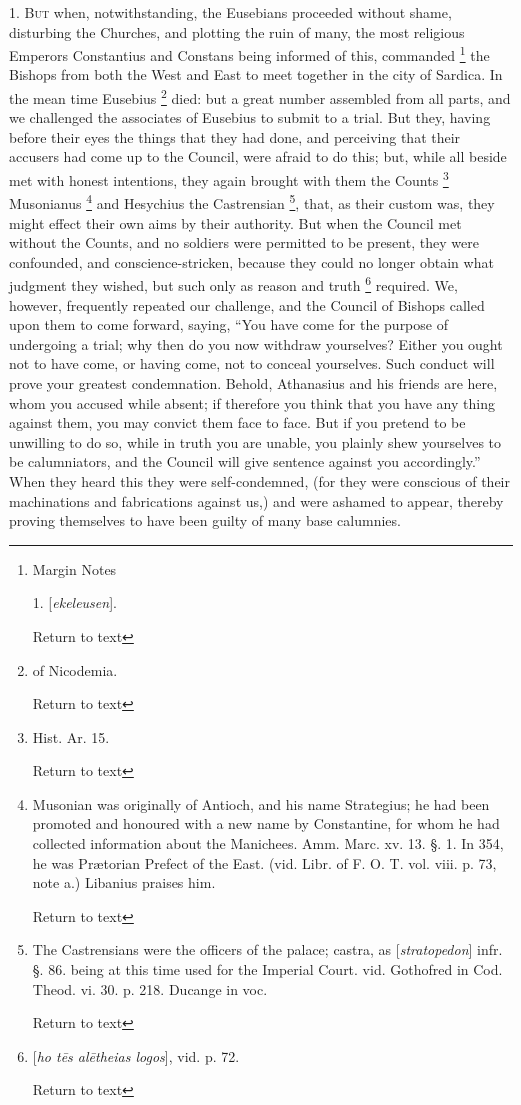 1. B\textsc{ut} when,
notwithstanding, the Eusebians proceeded without shame, disturbing the
Churches, and plotting the ruin of many, the most religious Emperors
Constantius and Constans being informed of this, commanded \footnote{Margin Notes

1. [\emph{ekeleusen}].

Return to text}
the Bishops from both the West and East to meet together in the city
of Sardica. In the mean time Eusebius \footnote{of
Nicodemia.

Return to text} died: but a great
number assembled from all parts, and we challenged the associates of
Eusebius to submit to a trial. But they, having before their eyes the
things that they had done, and perceiving that their accusers had come
up to the Council, were afraid to do this; but, while all beside met
with honest intentions, they again brought with them the Counts \footnote{Hist. Ar. 15.

Return to text} Musonianus \footnote{Musonian was originally of Antioch, and his
name Strategius; he had been promoted and honoured with a new name by
Constantine, for whom he had collected information about the Manichees.
Amm. Marc. xv. 13. §. 1. In 354, he was Prætorian Prefect of the
East. (vid. Libr. of F. O. T. vol. viii. p. 73, note a.) Libanius
praises him.

Return to text} and Hesychius the Castrensian
\footnote{The Castrensians were the officers of the
palace; castra, as [\emph{stratopedon}] infr. §. 86. being at this
time used for the Imperial Court. vid. Gothofred in Cod. Theod. vi.
30. p. 218. Ducange in voc.

Return to text}, that,
as their custom was, they might effect their own aims by their
authority. But when the Council met without the Counts, and no
soldiers were permitted to be present, they were confounded, and
conscience-stricken, because they could no longer obtain what judgment
they wished, but such only as reason and truth \footnote{[\emph{ho t\={e}s al\={e}theias logos}],
vid. p. 72.

Return to text} required. We,
however, frequently repeated our challenge, and the Council of Bishops
called upon them to come forward, saying, ``You have come for the
purpose of undergoing a trial; why then do you now withdraw
yourselves? Either you ought not to have come, or having come, not to
conceal yourselves. Such conduct will prove your greatest
condemnation. Behold, Athanasius and his friends are here, whom you
accused while absent; if therefore you think that you have any thing
against them, you may convict them face to face. But if you pretend to
be unwilling to do so, while in truth you are unable, you plainly shew
yourselves to be calumniators, and the Council will give sentence
against you accordingly.'' When they heard this they were
self-condemned, (for they were conscious of their machinations and
fabrications against us,) and were ashamed to appear, thereby proving
themselves to have been guilty of many base calumnies.

